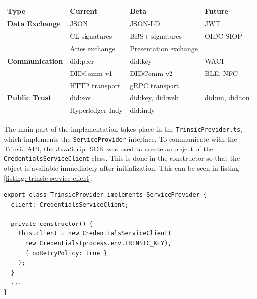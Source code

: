         	\begin{center}
        		\begin{threeparttable}
            		\begin{tabular}{llll}
            			\hline 
            			Type & Current & Beta & Future\tabularnewline
            			\hline 
            			\textbf{Data Exchange} & JSON & JSON-LD   & JWT \tabularnewline
            			\textbf{}              & CL signatures    & BBS+ signatures       & OIDC SIOP\tabularnewline
            			\textbf{}              & Aries exchange   & Presentation exchange & \tabularnewline
            			\textbf{Communication} & did:peer         & did:key               & WACI\tabularnewline
            			\textbf{}              & DIDComm v1       & DIDComm v2            & BLE, NFC\tabularnewline
            			\textbf{}              & HTTP transport   & gRPC transport        & \tabularnewline
            			\textbf{Public Trust}  & did:sov          & did:key, did:web      & did:un, did:ion\tabularnewline
            			\textbf{}              & Hyperledger Indy & did:indy              & \tabularnewline
            			\hline 
            		\end{tabular}
        	\end{threeparttable}
        	\label{tab: trinsic roadmap}
    	\end{center}
    	
        The main part of the implementation takes place in the \texttt{TrinsicProvider.ts}, which implements the \texttt{ServiceProvider} interface. To communicate with the Trinsic API, the JavaScript SDK was used to create an object of the \texttt{CredentialsServiceClient} class. This is done in the constructor so that the object is available immediately after initialization. This can be seen in listing \ref{listing: trinsic service client}.
    \newline
    \begin{lstlisting}[style=ES6, caption=Connecting to Trinsic API via SDK, label={listing: trinsic service client}]
export class TrinsicProvider implements ServiceProvider {
  client: CredentialsServiceClient;

  private constructor() {
    this.client = new CredentialsServiceClient(
      new Credentials(process.env.TRINSIC_KEY), 
      { noRetryPolicy: true }
    );
  }
  ...
}\end{lstlisting}
    
